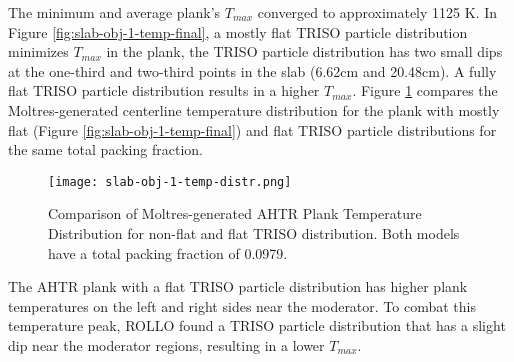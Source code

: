 The minimum and average plank's $T_{max}$ converged to approximately 
1125 K. 
In Figure \ref{fig:slab-obj-1-temp-final}, a mostly flat TRISO 
particle distribution minimizes $T_{max}$ in the plank, the TRISO particle distribution 
has two small dips at the one-third and two-third points in the slab (6.62cm and 20.48cm). 
A fully flat TRISO particle distribution results in a higher $T_{max}$.
Figure \ref{fig:slab-obj-1-temp-distr} compares the Moltres-generated centerline 
temperature distribution for the plank with mostly flat (Figure 
\ref{fig:slab-obj-1-temp-final}) and flat TRISO particle distributions for the same 
total packing fraction.
\begin{figure}[htbp]
    \centering
    \texttt{[image: slab-obj-1-temp-distr.png]}
    \caption{Comparison of Moltres-generated AHTR Plank Temperature Distribution for non-flat and flat
    TRISO distribution. Both models have a total packing fraction of 0.0979.}
    \label{fig:slab-obj-1-temp-distr}
\end{figure}
The AHTR plank with a flat TRISO particle distribution has higher plank temperatures 
on the left and right sides near the moderator. 
To combat this temperature peak, ROLLO found a TRISO particle distribution that 
has a slight dip near the moderator regions, resulting in a lower $T_{max}$.


